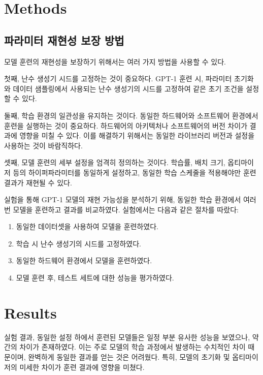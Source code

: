 \documentclass[conference]{IEEEtran}
\begin{document}
\section{Methods}

\subsection{파라미터 재현성 보장 방법}\label{AA}
모델 훈련의 재현성을 보장하기 위해서는 여러 가지 방법을 사용할 수 있다.

첫째, 난수 생성기 시드를 고정하는 것이 중요하다. GPT-1 훈련 시, 파라미터 초기화와 데이터 샘플링에서 사용되는 난수 생성기의 시드를 고정하여 같은 초기 조건을 설정할 수 있다.

둘째, 학습 환경의 일관성을 유지하는 것이다. 동일한 하드웨어와 소프트웨어 환경에서 훈련을 실행하는 것이 중요하다. 하드웨어의 아키텍처나 소프트웨어의 버전 차이가 결과에 영향을 미칠 수 있다. 이를 해결하기 위해서는 동일한 라이브러리 버전과 설정을 사용하는 것이 바람직하다.

셋째, 모델 훈련의 세부 설정을 엄격히 정의하는 것이다. 학습률, 배치 크기, 옵티마이저 등의 하이퍼파라미터를 동일하게 설정하고, 동일한 학습 스케줄을 적용해야만 훈련 결과가 재현될 수 있다.

실험을 통해 GPT-1 모델의 재현 가능성을 분석하기 위해, 동일한 학습 환경에서 여러 번 모델을 훈련하고 결과를 비교하였다. 실험에서는 다음과 같은 절차를 따랐다:\\

\begin{enumerate}
\item 동일한 데이터셋을 사용하여 모델을 훈련하였다.\\
\item 학습 시 난수 생성기의 시드를 고정하였다.\\
\item 동일한 하드웨어 환경에서 모델을 훈련하였다.\\
\item 모델 훈련 후, 테스트 세트에 대한 성능을 평가하였다.\\
\end{enumerate}

\section{Results}

실험 결과, 동일한 설정 하에서 훈련된 모델들은 일정 부분 유사한 성능을 보였으나, 약간의 차이가 존재하였다. 이는 주로 모델의 학습 과정에서 발생하는 수치적인 차이 때문이며, 완벽하게 동일한 결과를 얻는 것은 어려웠다. 특히, 모델의 초기화 및 옵티마이저의 미세한 차이가 훈련 결과에 영향을 미쳤다.
\end{document}
